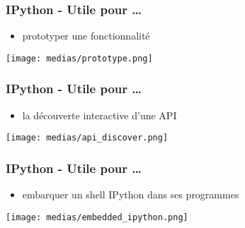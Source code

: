 \begin{frame}
  \frametitle{IPython - Utile pour \ldots}
    \begin{itemize}
      \item prototyper une fonctionnalité
    \end{itemize}
  \texttt{[image: medias/prototype.png]}
\end{frame}

\begin{frame}
  \frametitle{IPython - Utile pour \ldots}
    \begin{itemize}
      \item la découverte interactive d'une API
    \end{itemize}
  \texttt{[image: medias/api\_discover.png]}
\end{frame}

\begin{frame}
  \frametitle{IPython - Utile pour \ldots}
    \begin{itemize}
      \item embarquer un shell IPython dans ses programmes
    \end{itemize}
  \texttt{[image: medias/embedded\_ipython.png]}
\end{frame}
\newpage
